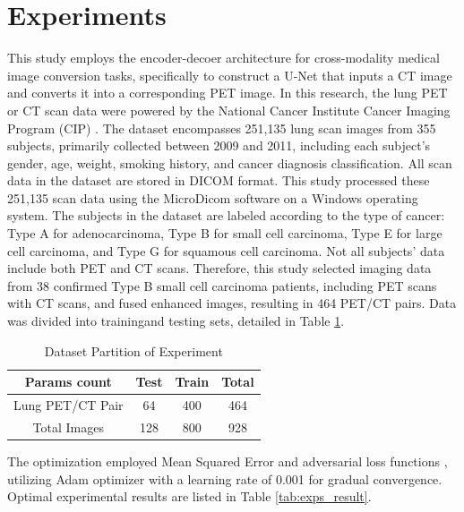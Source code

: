 \documentclass[a4paper, times, 10pt,twocolumn]{article}
\begin{document}
\section{Experiments}
This study employs the encoder-decoer architecture for cross-modality medical image conversion tasks, specifically to construct a U-Net that inputs a CT image and converts it into a corresponding PET image. In this research, the lung PET or CT scan data were powered by the National Cancer Institute Cancer Imaging Program (CIP) \cite{li_large-scale_2020}.  The dataset encompasses 251,135 lung scan images from 355 subjects, primarily collected between 2009 and 2011, including each subject's gender, age, weight, smoking history, and cancer diagnosis classification. All scan data in the dataset are stored in DICOM format. This study processed these 251,135 scan data using the MicroDicom software on a Windows operating system. The subjects in the dataset are labeled according to the type of cancer: Type A for adenocarcinoma, Type B for small cell carcinoma, Type E for large cell carcinoma, and Type G for squamous cell carcinoma. Not all subjects' data include both PET and CT scans. Therefore, this study selected imaging data from 38 confirmed Type B small cell carcinoma patients, including PET scans with CT scans, and fused enhanced images, resulting in 464 PET/CT pairs. Data was divided into trainingand testing sets, detailed in Table \ref{tab:dataset_partition_1}.

\begin{table}[h]
	\centering
	\caption{Dataset Partition of Experiment}
	\label{tab:dataset_partition_1}
	\begin{tabular}{cccc}
		\toprule
		Params count     & Test & Train & Total \\
		\midrule
		Lung PET/CT Pair & 64   & 400   & 464   \\
		Total Images     & 128  & 800   & 928   \\
		\bottomrule
	\end{tabular}
\end{table}

The optimization employed Mean Squared Error and adversarial loss functions \cite{pan_loss_2020}, utilizing Adam optimizer\cite{zhang_improved_2018} with a learning rate of 0.001 for gradual convergence. Optimal experimental results are listed in Table \ref{tab:exps_result}.
\end{document}
